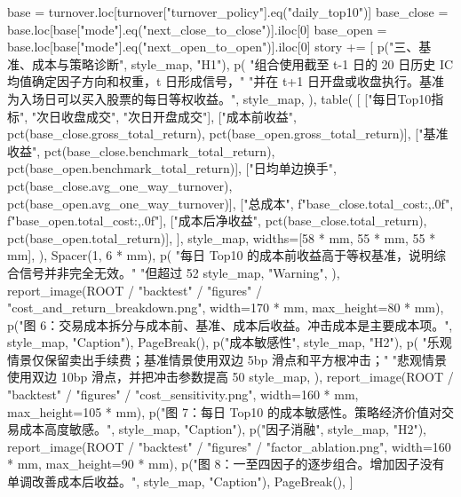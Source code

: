 \documentclass[UTF8,a4paper,fontset=fandol]{ctexart}
\begin{document}
\begin{ProjectCode}
{    base = turnover.loc[turnover["turnover_policy"].eq("daily_top10")]
    base_close = base.loc[base["mode"].eq("next_close_to_close")].iloc[0]
    base_open = base.loc[base["mode"].eq("next_open_to_open")].iloc[0]
    story += [
        p("三、基准、成本与策略诊断", style_map, "H1"),
        p(
            "组合使用截至 t-1 日的 20 日历史 IC 均值确定因子方向和权重，t 日形成信号，"
            "并在 t+1 日开盘或收盘执行。基准为入场日可以买入股票的每日等权收益。",
            style_map,
        ),
        table(
            [
                ["每日Top10指标", "次日收盘成交", "次日开盘成交"],
                ["成本前收益", pct(base_close.gross_total_return), pct(base_open.gross_total_return)],
                ["基准收益", pct(base_close.benchmark_total_return), pct(base_open.benchmark_total_return)],
                ["日均单边换手", pct(base_close.avg_one_way_turnover), pct(base_open.avg_one_way_turnover)],
                ["总成本", f"{base_close.total_cost:,.0f}", f"{base_open.total_cost:,.0f}"],
                ["成本后净收益", pct(base_close.total_return), pct(base_open.total_return)],
            ],
            style_map,
            widths=[58 * mm, 55 * mm, 55 * mm],
        ),
        Spacer(1, 6 * mm),
        p(
            "每日 Top10 的成本前收益高于等权基准，说明综合信号并非完全无效。"
            "但超过 52%
            style_map,
            "Warning",
        ),
        report_image(ROOT / "backtest" / "figures" / "cost_and_return_breakdown.png", width=170 * mm, max_height=80 * mm),
        p("图 6：交易成本拆分与成本前、基准、成本后收益。冲击成本是主要成本项。", style_map, "Caption"),
        PageBreak(),
        p("成本敏感性", style_map, "H2"),
        p(
            "乐观情景仅保留卖出手续费；基准情景使用双边 5bp 滑点和平方根冲击；"
            "悲观情景使用双边 10bp 滑点，并把冲击参数提高 50%
            style_map,
        ),
        report_image(ROOT / "backtest" / "figures" / "cost_sensitivity.png", width=160 * mm, max_height=105 * mm),
        p("图 7：每日 Top10 的成本敏感性。策略经济价值对交易成本高度敏感。", style_map, "Caption"),
        p("因子消融", style_map, "H2"),
        report_image(ROOT / "backtest" / "figures" / "factor_ablation.png", width=160 * mm, max_height=90 * mm),
        p("图 8：一至四因子的逐步组合。增加因子没有单调改善成本后收益。", style_map, "Caption"),
        PageBreak(),
    ]

}
\end{ProjectCode}
\end{document}

